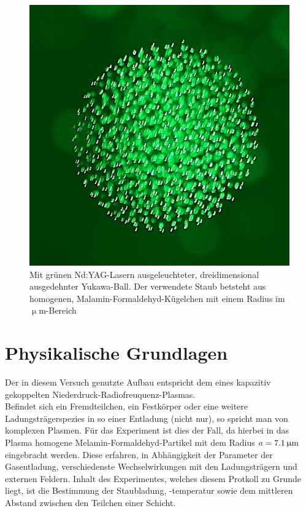 \documentclass[numbers=noenddot,a4paper,notitlepage,twoside,BCOR15mm]{scrartcl}
\begin{document}
		\begin{figure}[!h]
			\centering
			\begin{minipage}{0.49\textwidth}
				\centering
				\includegraphics[scale=1.]{figs/cluster.png}
			\end{minipage}
			\begin{minipage}{0.48\textwidth}
				\caption{Mit grünen Nd:YAG-Lasern ausgeleuchteter, dreidimensional ausgedehnter Yukawa-Ball. Der verwendete Staub betsteht aus homogenen, Malamin-Formaldehyd-Kügelchen mit einem Radius im $\upmu$m-Bereich}
			\end{minipage}
		\end{figure}


	\newpage
	\section{Physikalische Grundlagen}

		Der in diesem Versuch genutzte Aufbau entspricht dem eines kapazitiv gekoppelten Niederdruck-Radiofreuquenz-Plasmas.\\
		Befindet sich ein Fremdteilchen, ein Festkörper oder eine weitere Ladungsträgerspezies in so einer Entladung (nicht nur), so spricht man von komplexen Plasmen. Für das Experiment ist dies der Fall, da hierbei in das Plasma homogene Melamin-Formaldehyd-Partikel mit dem Radius $a=\unit[7.1]{\upmu m}$ eingebracht werden. Diese erfahren, in Abhängigkeit der Parameter der Gasentladung, verschiedenste Wechselwirkungen mit den Ladungsträgern und externen Feldern. Inhalt des Experimentes, welches diesem Protkoll zu Grunde liegt, ist die Bestimmung der Staubladung, -temperatur sowie dem mittleren Abstand zwischen den Teilchen einer Schicht.
\end{document}
